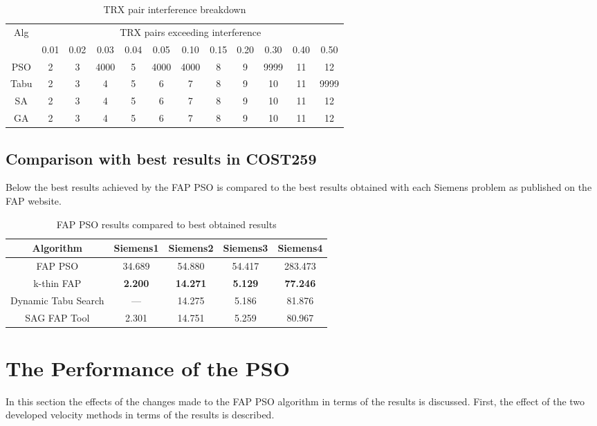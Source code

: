 \begin{table}[H]
\centering
	\begin{tabular}{cccccccccccc}
	\toprule
    Alg & \multicolumn{11}{c}{TRX pairs exceeding interference}\\
    & 0.01 & 0.02 & 0.03 & 0.04 & 0.05 & 0.10 & 0.15 & 0.20 & 0.30 & 0.40 & 0.50 \\
    \midrule
    PSO & 2 & 3 & \tiny{4000} & 5 & \small{4000} & \footnotesize{4000} & 8 & 9 & \scriptsize{9999} & 11 & 12\\
    Tabu & 2 & 3 & 4 & 5 & 6 & 7 & 8 & 9 & 10 & 11 & 9999\\
    SA & 2 & 3 & 4 & 5 & 6 & 7 & 8 & 9 & 10 & 11 & 12\\
    GA & 2 & 3 & 4 & 5 & 6 & 7 & 8 & 9 & 10 & 11 & 12\\
    \bottomrule
	\end{tabular}
\caption{TRX pair interference breakdown}
\label{tab:breakdown-siem4m1}
\end{table}
\subsection{Comparison with best results in COST259}
Below the best results achieved by the FAP PSO is compared to the best results obtained with each Siemens problem as published on the FAP website\cite{FAPWeb}.
\begin{table}[H]
\centering
	\begin{tabular}{| c | c | c | c | c |}
	\hline
	Algorithm & Siemens1 & Siemens2 & Siemens3 & Siemens4 \\ \hline
	FAP PSO & 34.689 & 54.880 & 54.417 & 283.473 \\ \hline
	k-thin FAP & \textbf{2.200} & \textbf{14.271} & \textbf{5.129} & \textbf{77.246} \\ \hline
	Dynamic Tabu Search & --- & 14.275 & 5.186 & 81.876 \\ \hline
	SAG FAP Tool & 2.301 & 14.751 & 5.259 & 80.967 \\ \hline
	\end{tabular}
\caption{FAP PSO results compared to best obtained results}
\label{tab:siem4m2}
\end{table}
\section{The Performance of the PSO}
In this section the effects of the changes made to the FAP PSO algorithm in terms of the results is discussed. First, the effect of the two developed velocity methods in terms of the results is described. 


